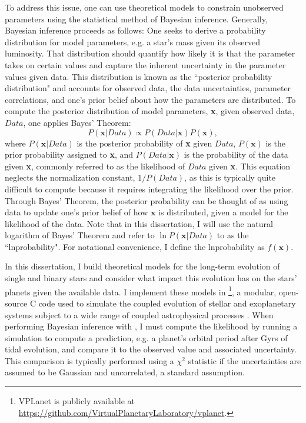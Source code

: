To address this issue, one can use theoretical models to constrain unobserved parameters using the statistical method of Bayesian inference. Generally, Bayesian inference proceeds as follows:  One seeks to derive a probability distribution for model parameters, e.g. a star's mass given its observed luminosity.  That distribution should quantify how likely it is that the parameter takes on certain values and capture the inherent uncertainty in the parameter values given data.  This distribution is known as the ``posterior probability distribution" and accounts for observed data, the data uncertainties, parameter correlations, and one's prior belief about how the parameters are distributed. To compute the posterior distribution of model parameters, \textbf{x}, given observed data, $Data$, one applies Bayes' Theorem: 
\begin{equation} \label{intro:eqn:bayes}
P(\textbf{x} | Data) \propto P(Data | \textbf{x}) P(\textbf{x}),
\end{equation}
where $P(\textbf{x} | Data)$ is the posterior probability of \textbf{x} given $Data$, $P(\textbf{x})$ is the prior probability assigned to \textbf{x}, and $P(Data | \textbf{x})$ is the probability of the data given \textbf{x}, commonly referred to as the likelihood of $Data$ given \textbf{x}. This equation neglects the normalization constant, $1/P(Data)$, as this is typically quite difficult to compute because it requires integrating the likelihood over the prior. Through Bayes' Theorem, the posterior probability can be thought of as using data to update one's prior belief of how $\textbf{x}$ is distributed, given a model for the likelihood of the data. Note that in this dissertation, I will use the natural logarithm of Bayes' Theorem and refer to $\ln P(\textbf{x} | Data)$ to as the ``lnprobability". For notational convenience, I define the lnprobability as $f(\textbf{x})$. 

In this dissertation, I build theoretical models for the long-term evolution of single and binary stars and consider what impact this evolution has on the stars' planets given the available data. I implement these models in \vplanet\footnote{VPLanet is publicly available
at \href{https://github.com/VirtualPlanetaryLaboratory/vplanet}{{https://github.com/VirtualPlanetaryLaboratory/vplanet}}.}, a modular, open-source C code used to simulate the coupled evolution of stellar and exoplanetary systems subject to a wide range of coupled astrophysical processes \citep{Barnes2019}. When performing Bayesian inference with \vplanet, I must compute the likelihood by running a simulation to compute a prediction, e.g. a planet's orbital period after Gyrs of tidal evolution, and compare it to the observed value and associated uncertainty. This comparison is typically performed using a $\chi^2$ statistic if the uncertainties are assumed to be Gaussian and uncorrelated, a standard assumption. 

